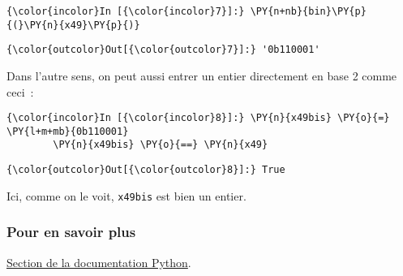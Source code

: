     \begin{Verbatim}[commandchars=\\\{\}]
{\color{incolor}In [{\color{incolor}7}]:} \PY{n+nb}{bin}\PY{p}{(}\PY{n}{x49}\PY{p}{)}
\end{Verbatim}


\begin{Verbatim}[commandchars=\\\{\}]
{\color{outcolor}Out[{\color{outcolor}7}]:} '0b110001'
\end{Verbatim}
            
    Dans l'autre sens, on peut aussi entrer un entier directement en base 2
comme ceci~:

    \begin{Verbatim}[commandchars=\\\{\}]
{\color{incolor}In [{\color{incolor}8}]:} \PY{n}{x49bis} \PY{o}{=} \PY{l+m+mb}{0b110001}
        \PY{n}{x49bis} \PY{o}{==} \PY{n}{x49}
\end{Verbatim}


\begin{Verbatim}[commandchars=\\\{\}]
{\color{outcolor}Out[{\color{outcolor}8}]:} True
\end{Verbatim}
            
    Ici, comme on le voit, \texttt{x49bis} est bien un entier.

    \hypertarget{pour-en-savoir-plus}{%
\subsubsection{Pour en savoir plus}\label{pour-en-savoir-plus}}

    \href{https://docs.python.org/3/library/stdtypes.html\#bitwise-operations-on-integer-types}{Section
de la documentation Python}.